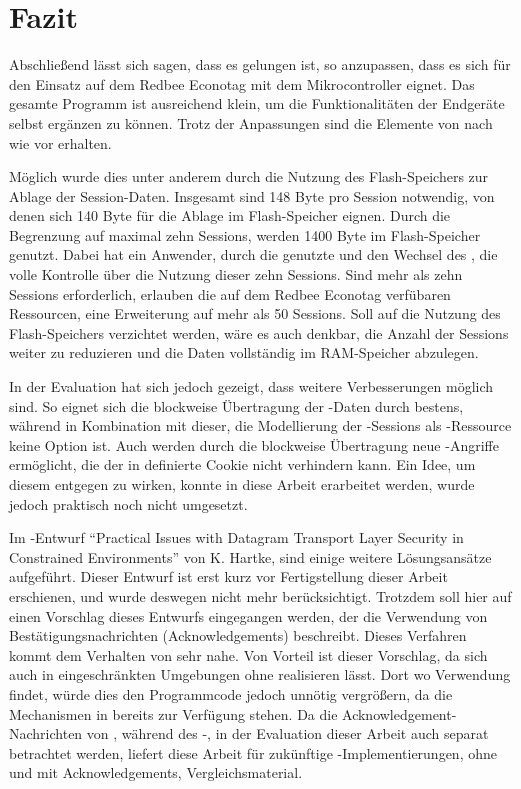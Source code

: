 \chapter{Fazit}
\label{chp:fazit}

Abschließend lässt sich sagen, dass es gelungen ist,  so anzupassen, dass es sich für den Einsatz auf dem
Redbee Econotag mit dem  Mikrocontroller eignet. Das gesamte Programm ist ausreichend klein, um die
Funktionalitäten der Endgeräte selbst ergänzen zu können. Trotz der Anpassungen sind die Elemente von 
nach wie vor erhalten.

Möglich wurde dies unter anderem durch die Nutzung des Flash-Speichers zur Ablage der Session-Daten. Insgesamt
sind 148 Byte pro Session notwendig, von denen sich 140 Byte für die Ablage im Flash-Speicher eignen. Durch die
Begrenzung auf maximal zehn Sessions, werden 1400 Byte im Flash-Speicher genutzt. Dabei hat ein Anwender, durch
die genutzte  und den Wechsel des , die volle Kontrolle über die Nutzung dieser zehn
Sessions. Sind mehr als zehn Sessions erforderlich, erlauben die auf dem Redbee Econotag verfübaren Ressourcen,
eine Erweiterung auf mehr als 50 Sessions. Soll auf die Nutzung des Flash-Speichers verzichtet werden, wäre es
auch denkbar, die Anzahl der Sessions weiter zu reduzieren und die Daten vollständig im RAM-Speicher abzulegen.

In der Evaluation hat sich jedoch gezeigt, dass weitere Verbesserungen möglich sind. So eignet sich die blockweise
Übertragung der -Daten durch  bestens, während in Kombination mit dieser, die Modellierung
der -Sessions als -Ressource keine Option ist. Auch werden durch die blockweise Übertragung neue
-Angriffe ermöglicht, die der in  definierte Cookie nicht verhindern kann. Ein Idee, um diesem
entgegen zu wirken, konnte in diese Arbeit erarbeitet werden, wurde jedoch praktisch noch nicht umgesetzt.

Im -Entwurf "`Practical Issues with Datagram Transport Layer Security in Constrained Environments"' \cite{draftpractical}
von K. Hartke, sind einige weitere Lösungsansätze aufgeführt. Dieser Entwurf ist erst kurz vor Fertigstellung dieser
Arbeit erschienen, und wurde deswegen nicht mehr berücksichtigt. Trotzdem soll hier auf einen Vorschlag dieses Entwurfs
eingegangen werden, der die Verwendung von Bestätigungsnachrichten (Acknowledgements) beschreibt. Dieses Verfahren
kommt dem Verhalten von  sehr nahe. Von Vorteil ist dieser Vorschlag, da sich  auch in eingeschränkten
Umgebungen ohne  realisieren lässt. Dort wo  Verwendung findet, würde dies den Programmcode jedoch
unnötig vergrößern, da die Mechanismen in  bereits zur Verfügung stehen. Da die Acknowledgement-Nachrichten von
, während des -, in der Evaluation dieser Arbeit auch separat betrachtet werden,
liefert diese Arbeit für zukünftige -Implementierungen, ohne  und mit Acknowledgements, Vergleichsmaterial.

